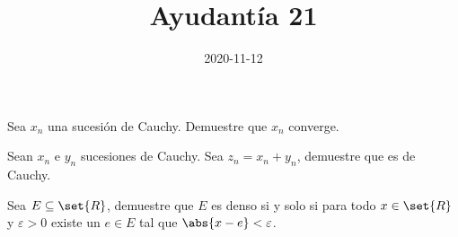 \documentclass{ayudantia}
\title{Ayudantía 21}
\date{2020-11-12}
\begin{document}
\maketitle

\begin{prob}
    Sea \(x_n\) una sucesión de Cauchy. Demuestre que \(x_n\) converge.
\end{prob}

\begin{ans}
    \begin{sol}

    \end{sol}
\end{ans}



\begin{prob}
    Sean \(x_n\) e \(y_n\) sucesiones de Cauchy. Sea \(z_n=x_n+y_n\), demuestre que es de Cauchy.
\end{prob}

\begin{ans}
    \begin{sol}

    \end{sol}
\end{ans}



\begin{prob}

\end{prob}

\begin{ans}
    \begin{sol}

    \end{sol}
\end{ans}



\begin{prob}
    Sea \(E\subseteq\set{R}\), demuestre que \(E\) es denso si y solo si para todo \(x\in\set{R}\) y \(\varepsilon>0\) existe un \(e\in E\) tal que \(\abs{x-e}<\varepsilon\).
\end{prob}

\begin{ans}
    \begin{sol}

    \end{sol}
\end{ans}
\end{document}
